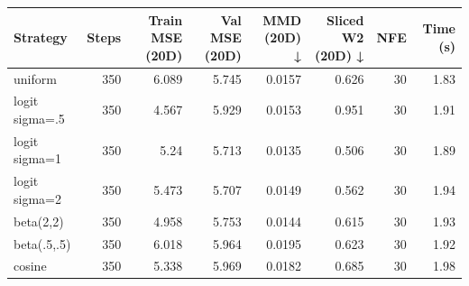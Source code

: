 \begin{tabular}{lrrrrrrr}
\toprule
Strategy & Steps & Train MSE (20D) & Val MSE (20D) & MMD (20D) ↓ & Sliced W2 (20D) ↓ & NFE & Time (s) \\
\midrule
uniform & 350 & 6.089 & 5.745 & 0.0157 & 0.626 & 30 & 1.83 \\
logit sigma=.5 & 350 & 4.567 & 5.929 & 0.0153 & 0.951 & 30 & 1.91 \\
logit sigma=1 & 350 & 5.24 & 5.713 & 0.0135 & 0.506 & 30 & 1.89 \\
logit sigma=2 & 350 & 5.473 & 5.707 & 0.0149 & 0.562 & 30 & 1.94 \\
beta(2,2) & 350 & 4.958 & 5.753 & 0.0144 & 0.615 & 30 & 1.93 \\
beta(.5,.5) & 350 & 6.018 & 5.964 & 0.0195 & 0.623 & 30 & 1.92 \\
cosine & 350 & 5.338 & 5.969 & 0.0182 & 0.685 & 30 & 1.98 \\
\bottomrule
\end{tabular}

